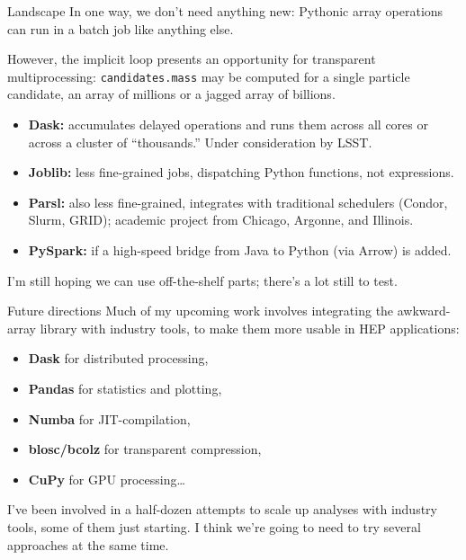 \documentclass[aspectratio=169]{beamer}
\begin{document}
\begin{frame}{Landscape}
\vspace{0.5 cm}
In one way, we don't need anything new: Pythonic array operations can run in a batch job like anything else.

\vspace{0.5 cm}
However, the implicit loop presents an opportunity for transparent multiprocessing: {\tt\small candidates.mass} may be computed for a single particle candidate, an array of millions or a jagged array of billions.

\vspace{0.25 cm}
\begin{itemize}
\item {\bf Dask:} accumulates delayed operations and runs them across all cores or across a cluster of ``thousands.'' Under consideration by LSST.
\item {\bf Joblib:} less fine-grained jobs, dispatching Python functions, not expressions.
\item {\bf Parsl:} also less fine-grained, integrates with traditional schedulers (Condor, Slurm, GRID); academic project from Chicago, Argonne, and Illinois.
\item {\bf PySpark:} if a high-speed bridge from Java to Python (via Arrow) is added.
\end{itemize}

\vspace{0.25 cm}
I'm still hoping we can use off-the-shelf parts; there's a lot still to test.
\end{frame}

\begin{frame}{Future directions}
\large
\vspace{0.5 cm}
Much of my upcoming work involves integrating the awkward-array library with industry tools, to make them more usable in HEP applications:

\begin{center}
\begin{minipage}{0.7\linewidth}
\begin{itemize}
\item {\bf Dask} for distributed processing,
\item {\bf Pandas} for statistics and plotting,
\item {\bf Numba} for JIT-compilation,
\item {\bf blosc/bcolz} for transparent compression,
\item {\bf CuPy} for GPU processing\ldots
\end{itemize}
\end{minipage}
\end{center}

\vspace{0.5 cm}
I've been involved in a half-dozen attempts to scale up analyses with industry tools, some of them just starting. I think we're going to need to try several approaches at the same time.
\end{frame}
\end{document}
